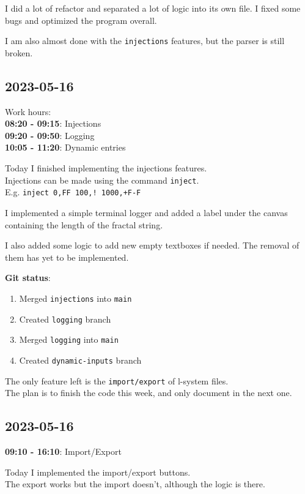 \documentclass{article}
\begin{document}
I did a lot of refactor and separated a lot of logic
into its own file. I fixed some bugs and optimized the program
overall.

I am also almost done with the \texttt{injections}
features, but the parser is still broken.

\subsection{2023-05-16}

Work hours:\\
\textbf{08:20 - 09:15}: Injections \\
\textbf{09:20 - 09:50}: Logging \\
\textbf{10:05 - 11:20}: Dynamic entries

Today I finished implementing the injections features. \\
Injections can be made using the command \texttt{inject}. \\
E.g. \texttt{inject 0,FF 100,! 1000,+F-F}

I implemented a simple terminal logger
and added a label under the canvas containing the length
of the fractal string.

I also added some logic to add new empty textboxes
if needed. The removal of them has yet to be implemented.

\textbf{Git status}:
\begin{enumerate}
    \item Merged \texttt{injections} into \texttt{main}
    \item Created \texttt{logging} branch
    \item Merged \texttt{logging} into \texttt{main}
    \item Created \texttt{dynamic-inputs} branch
\end{enumerate}

The only feature left is the \texttt{import/export} of l-system files. \\
The plan is to finish the code this week, and only document in the next one.

\subsection{2023-05-16}

\textbf{09:10 - 16:10}: Import/Export

Today I implemented the import/export buttons. \\
The export works but the import doesn't, although the logic is there.
\end{document}
